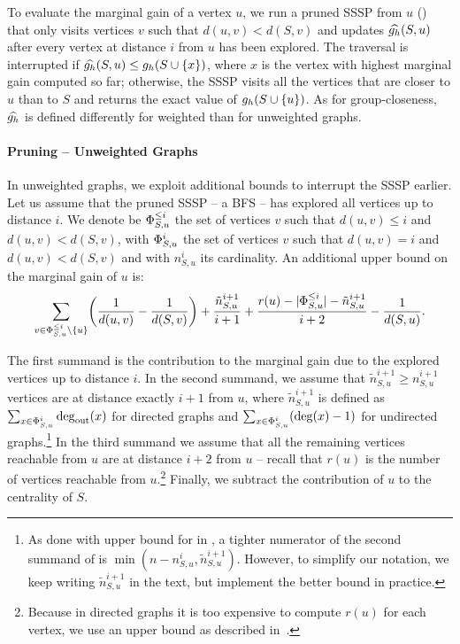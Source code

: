 To evaluate the marginal gain of a vertex $u$, we run a pruned
SSSP from $u$ () that only
visits vertices $v$ such that $d(u, v) < d(S, v)$ and updates
$\widehat{g_h}(S, u)$ after every vertex at distance $i$ from $u$
has been explored. The traversal is interrupted if
$\gharmupp(S, u) \le \gharm(S \cup \set{x})$, where $x$ is the
vertex with highest marginal gain computed so far; otherwise, the
SSSP visits all the vertices that are closer to $u$ than to $S$ and
returns the exact value of $\gharm(S \cup \set{u})$.
As for group-closeness, $\widehat{g_h}$ is defined differently for
weighted than for unweighted graphs.

\paragraph{Pruning -- Unweighted Graphs}
%
In unweighted graphs, we exploit additional bounds to interrupt the
SSSP earlier. Let us assume that the pruned SSSP -- \ie a BFS --
has explored all vertices up to distance $i$. We denote be
$\Phi_{S, u}^{\le i}$ the set of vertices $v$ such that $d(u, v) \le i$
and $d(u, v) < d(S, v)$, with $\Phi_{S, u}^i$ the set of vertices $v$
such that $d(u, v) = i$ and $d(u, v) < d(S, v)$ and with $n_{S, u}^i$ its
cardinality. An additional upper bound on the marginal gain of $u$ is:
%
\begin{equation}
\label{eq:gh-gc-nbound}
\sum_{v \in \PhiSu^{\le i}\setminus \set{u}}
\roundb{\frac{1}{d(u, v)} - \frac{1}{d(S, v)}} +
\frac{\tilde{n}_{S, u}^{i + 1}}{i + 1} + \frac{r(u) - |\PhiSu^{\le i}| - \tilde{n}_{S, u}^{i + 1}}{i + 2} -
\frac{1}{d(S, u)}.
\end{equation}

The first summand is the contribution to the marginal gain due to the explored
vertices up to distance $i$. In the second summand, we assume that
$\tilde{n}_{S, u}^{i + 1} \ge n_{S, u}^{i + 1}$ vertices are at distance exactly
$i + 1$ from $u$, where $\tilde{n}_{S, u}^{i + 1}$ is defined as
$\sum_{x \in \Phi_{S, u}^i}\deg_{\text{out}}(x)$ for directed graphs and
$\sum_{x \in \Phi_{S, u}^i}(\deg(x) - 1)$ for undirected graphs.\footnote{As done
with upper bound for \nbcut in , a tighter numerator of
the second summand of  is $\min(n - n_{S, u}^i,
\tilde{n}_{S, u}^{i + 1})$. However, to simplify our notation, we keep writing
$\tilde{n}_{S, u}^{i + 1}$ in the text,
but implement the better bound in practice.}
In the third summand we assume that all the remaining vertices reachable from $u$
are at distance $i + 2$ from $u$ -- recall that $r(u)$ is the number of vertices
reachable from $u$.\footnote{Because in directed graphs it is too expensive to compute
$r(u)$ for each vertex, we use an upper bound as described
in~\cite{DBLP:journals/tkdd/BergaminiBCMM19}.} Finally, we subtract the contribution
of $u$ to the centrality of $S$.

